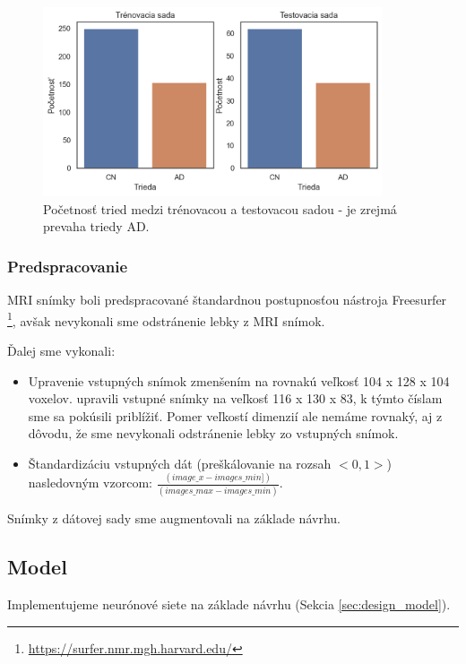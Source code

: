 \begin{figure}[H]
    \centering
    \includegraphics[width=10cm]{assets/images/dataset_classes.png}
    \caption{Početnosť tried medzi trénovacou a testovacou sadou - je zrejmá prevaha triedy AD.}
    \label{fig:dataset_classes}
\end{figure}

\subsubsection{Predspracovanie}

MRI snímky boli predspracované štandardnou postupnosťou nástroja Freesurfer \footnote{\url{https://surfer.nmr.mgh.harvard.edu/}}, avšak nevykonali sme odstránenie lebky z MRI snímok.

Ďalej sme vykonali:

\begin{itemize}
    \item Upravenie vstupných snímok zmenšením na rovnakú veľkosť 104 x 128 x 104 voxelov. \citeauthor*{esmaeilzadeh2018end} upravili vstupné snímky na veľkosť 116 x 130 x 83, k týmto číslam sme sa pokúsili priblížiť. Pomer veľkostí dimenzií ale nemáme rovnaký, aj z dôvodu, že sme nevykonali odstránenie lebky zo vstupných snímok.
    \item Štandardizáciu vstupných dát (preškálovanie na rozsah $<0, 1>$) nasledovným vzorcom: $\frac{(image\_x - images\_min])}{(images\_max - images\_min)}$.
\end{itemize}

Snímky z dátovej sady sme augmentovali na základe návrhu.

\subsection{Model}

Implementujeme neurónové siete na základe návrhu (Sekcia \ref{sec:design_model}).

